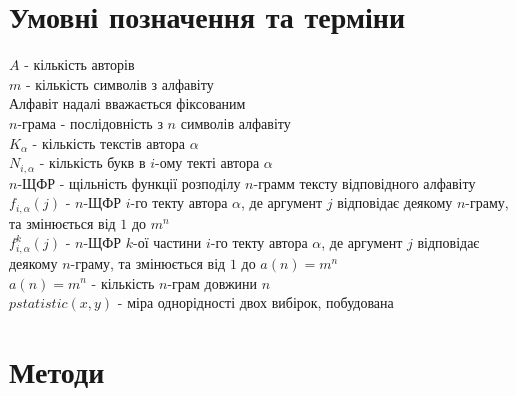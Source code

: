 \documentclass[12pt, a4paper]{extarticle}
\begin{document}
\section{Умовні позначення та терміни}
$A$ - кількість авторів\\
$m$ - кількість символів з алфавіту\\
Алфавіт надалі вважається фіксованим\\
$n$-грама - послідовність з $n$ символів алфавіту\\
$K_\alpha$ - кількість текстів автора $\alpha$\\
$N_{i,\alpha}$ - кількість букв в $i$-ому текті автора $\alpha$\\
$n$-ЩФР - щільність функції розподілу $n$-грамм тексту відповідного алфавіту\\
$f_{i,\alpha}(j)$ - $n$-ЩФР $i$-го текту автора $\alpha$, де аргумент $j$ відповідає деякому $n$-граму, та змінюється від $1$ до $m^n$\\ 
$f_{i,\alpha}^k(j)$ - $n$-ЩФР $k$-ої частини $i$-го текту автора $\alpha$, де аргумент $j$ відповідає деякому $n$-граму, та змінюється від $1$ до $a(n)=m^n$\\
$a(n)=m^n$ - кількість $n$-грам довжини $n$\\
$pstatistic(x,y)$ - міра однорідності двох вибірок, побудована 

\section{Методи}
\end{document}
